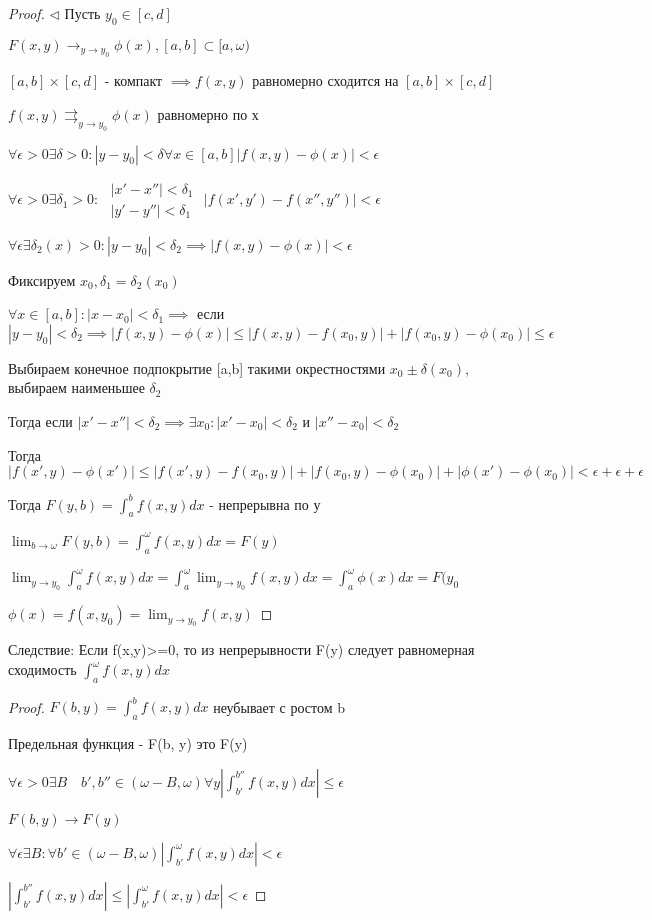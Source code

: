 \documentclass[a4paper, 12pt]{article}
\theoremstyle{definition}
\theoremstyle{remark}
\begin{document}
\begin{proof}
$\triangleleft$ Пусть $y_0\in[c,d]$

$F(x,y)\rightarrow_{y\to y_0} \phi(x), [a, b]\subset [a,\omega)$

$[a,b] \times [c,d]$ - компакт $\implies f(x,y)$ равномерно сходится на $[a,b] \times [c,d]$

$f(x,y)\rightrightarrows_{y\to y_0} \phi(x)$ равномерно по х

$\forall \epsilon > 0 \exists \delta>0: |y-y_0|< \delta \forall x\in [a,b] |f(x,y) - \phi(x)|< \epsilon$


$\forall \epsilon > 0 \exists \delta_1>0:$
$
          \begin{array}{l}
               |x' - x''|< \delta_1\\
               |y' - y''|<\delta_1
          \end{array}
          $
          $|f(x',y') - f(x'',y'')|<\epsilon$

$\forall \epsilon \exists \delta_2(x)>0: |y - y_0|<\delta_2 \implies |f(x,y)-\phi(x)|<\epsilon$

Фиксируем $x_0, \delta_1 = \delta_2(x_0)$

$\forall x \in [a, b]: |x - x_0|< \delta_1\implies$ если $|y-y_0|< \delta_2 \implies|f(x,y) - \phi(x)|\leq |f(x,y) -f(x_0,y)|+|f(x_0, y) - \phi(x_0)|\leq\epsilon$

Выбираем конечное подпокрытие [a,b] такими окрестностями $x_0\pm \delta(x_0),$ выбираем наименьшее $\delta_2$

Тогда если $|x' - x''|<\delta_2\implies\exists x_0: |x' - x_0|<\delta_2$ и $|x'' - x_0|< \delta_2$

Тогда $|f(x',y) - \phi(x')|\leq |f(x',y) - f(x_0,y)|+|f(x_0, y) - \phi(x_0)|+|\phi(x') - \phi(x_0)| < \epsilon+\epsilon+\epsilon$

Тогда $F(y, b) = \int_a^b f(x,y)dx $ - непрерывна по у

$\lim_{b \to \omega} F(y,b)  = \int_a^\omega f(x,y)dx = F(y)$

$\lim_{y \to y_0} \int_a^\omega f(x,y)dx = \int_a^\omega \lim_{y \to y_0} f(x,y)dx  = \int_a^\omega\phi(x)dx = F(y_0$

$\phi(x) = f(x,y_0) = \lim_{y\to y_0} f(x,y)$

\end{proof}

Следствие: Если f(x,y)>=0, то из непрерывности F(y) следует равномерная сходимость $\int_a^\omega f(x,y)dx$

\begin{proof}
     $F(b,y) = \int_a^b f(x,y) dx$ неубывает с ростом b

     Предельная функция - F(b, y) это F(y)

     $\forall \epsilon > 0 \exists B \quad b', b'' \in (\omega -B, \omega) \forall y |\int_{b'}^{b''}f(x,y) dx|\leq \epsilon$

     $F(b,y)\rightarrow F(y)$

     $\forall \epsilon\exists B: \forall b' \in (\omega - B, \omega) |\int_{b'}^\omega f(x,y)dx |< \epsilon$

     $|\int_{b'}^{b''}f(x,y) dx|\leq|\int_{b'}^\omega f(x,y)dx |< \epsilon$
\end{proof}
\end{document}
